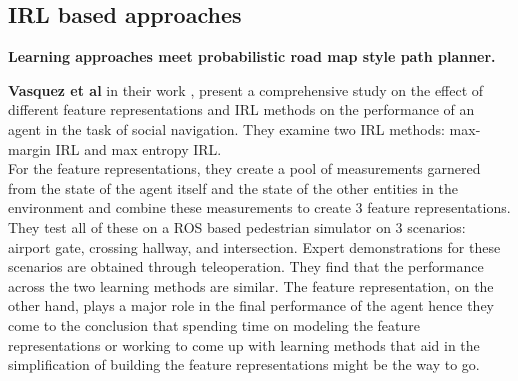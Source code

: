 \subsection*{IRL based approaches}
\textbf{Learning approaches meet probabilistic road map style path planner.}

\textbf{Vasquez et al} in their work \cite{vasquez_inverse_2014}, present a comprehensive study on the effect of different feature representations and IRL methods on the performance of an agent in the task of social navigation. They examine two IRL methods:
max-margin IRL and max entropy IRL.\\
For the feature representations, they create a pool of measurements garnered from the state of the agent itself and the state of the other entities in the environment and combine these measurements to create 3 feature representations. \\
They test all of these on a ROS based pedestrian simulator on 3 scenarios: airport gate, crossing hallway, and intersection. Expert demonstrations for these scenarios are obtained through teleoperation. They find that the performance across the two learning methods are similar. The feature representation, on the other hand, plays a major role in the final performance of the agent hence they come to the conclusion that spending time on modeling the feature representations or working to come up with learning methods that aid in the simplification of building the feature representations might be the way to go.\\

